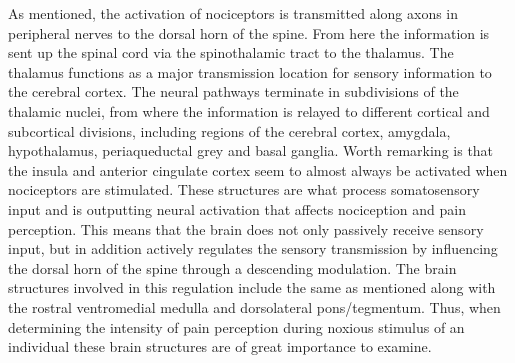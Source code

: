 As mentioned, the activation of nociceptors is transmitted along axons in peripheral nerves to the dorsal horn of the spine. From here the information is sent up the spinal cord via the spinothalamic tract to the thalamus. The thalamus functions as a major transmission location for sensory information to the cerebral cortex. The neural pathways terminate in subdivisions of the thalamic nuclei, from where the information is relayed to different cortical and subcortical divisions, including regions of the cerebral cortex, amygdala, hypothalamus, periaqueductal grey and basal ganglia. Worth remarking is that the insula and anterior cingulate cortex seem to almost always be activated when nociceptors are stimulated. \cite{Tracey2007} These structures are what process somatosensory input and is outputting neural activation that affects nociception and pain perception. \cite{Garland2013} This means that the brain does not only passively receive sensory input, but in addition actively regulates the sensory transmission by influencing the dorsal horn of the spine through a descending modulation. The brain structures involved in this regulation include the same as mentioned along with the rostral ventromedial medulla and dorsolateral pons/tegmentum. \cite{Tracey2007} Thus, when determining the intensity of pain perception during noxious stimulus of an individual these brain structures are of great importance to examine. 
